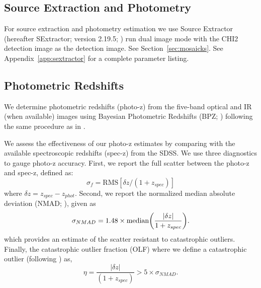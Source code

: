 \documentclass[apj, revtex4]{emulateapj}
\begin{document}
\subsection{Source Extraction and Photometry}
For source extraction and photometry estimation we use Source Extractor (hereafter SExtractor; version 2.19.5; \citealt{Bertin1996}) run dual image mode with the CHI2 detection image as the detection image. See Section~\ref{sec:mosaicks}. See Appendix~\ref{app:sextractor} for a complete parameter listing.

\subsection{Photometric Redshifts}
We determine photometric redshifts (photo-z) from the five-band optical and IR (when available) images using Bayesian Photometric Redshifts (BPZ; \citealt{Benitez2000, Coe2006}) following the same procedure as in \cite{Menanteau2009a}.

We assess the effectiveness of our photo-z estimates by comparing with the available spectroscopic redshifts (spec-z) from the SDSS. We use three diagnostics to gauge photo-z accuracy. First, we report the full scatter between the photo-z and spec-z, defined as:
\begin{equation}
	\sigma_f = \mathrm{RMS}[\delta z/(1+z_{spec})]
\end{equation}
where $\delta z = z_{spec} - z_{phot}$. Second, we report the normalized median absolute deviation (NMAD; \citealt{Ilbert2009, Dahlen2013, Molino2017}), given as
\begin{equation}
	\sigma_{NMAD} = 1.48 \times \mathrm{median} \bigg{(} \frac{|\delta z|}{1+z_{spec}} \bigg{)}.
\end{equation}   
which provides an estimate of the scatter resistant to catastrophic outliers. Finally, the catastrophic outlier fraction (OLF) where we define a catastrophic outlier (following \citealt{Molino2017}) as,
\begin{equation}
	\eta = \frac{|\delta z|}{(1+z_{spec})} > 5 \times \sigma_{NMAD}.
\end{equation}
\end{document}
